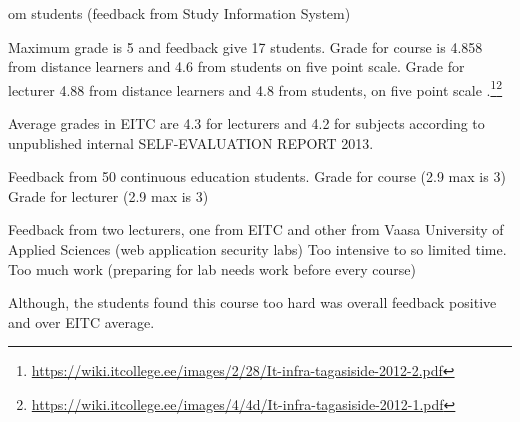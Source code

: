 om students (feedback from Study Information System)

Maximum grade is 5 and feedback give 17 students.
Grade for course is 4.858 from distance learners and  4.6 from students on five point scale.
Grade for lecturer 4.88 from distance learners and 4.8 from students, on five point scale
.\footnote{\url{https://wiki.itcollege.ee/images/2/28/It-infra-tagasiside-2012-2.pdf}}\footnote{\url{https://wiki.itcollege.ee/images/4/4d/It-infra-tagasiside-2012-1.pdf}}

Average grades in \gls{EITC} are 4.3 for lecturers and 4.2 for subjects according to unpublished internal SELF-EVALUATION REPORT 2013.

Feedback from 50 continuous education students.
Grade for course (2.9 max is 3)
Grade for lecturer (2.9 max is 3)

Feedback from two lecturers, one from \gls{EITC} and other from Vaasa University of Applied Sciences (web application security labs)
Too intensive to so limited time.
Too much work (preparing for lab needs work before every course)



Although, the students found this course too hard was overall feedback positive and over \gls{EITC} average.